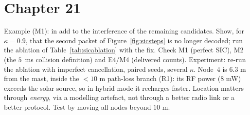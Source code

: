 \section*{Chapter 21}
 Example (M1): in  add  to the interference of the remaining candidates. Show, for $\kappa=0.9$, that the second packet of Figure~\ref{fig:sicsteps} is no longer decoded; run the ablation of Table~\ref{tab:sicablation} with the fix.
 Check M1 (perfect SIC), M2 (the $5$~ms collision definition) and E4/M4 (delivered counts). Experiment: re-run the ablation with imperfect cancellation, paired seeds, several $\kappa$.
 Node~4 is $6.3$ m from the mast, inside the $<10$ m path-loss branch (R1): its RF power ($8$ mW) exceeds the solar source, so in hybrid mode it recharges faster. Location matters through \emph{energy}, via a modelling artefact, not through a better radio link or a better protocol. Test by moving all nodes beyond $10$ m.
